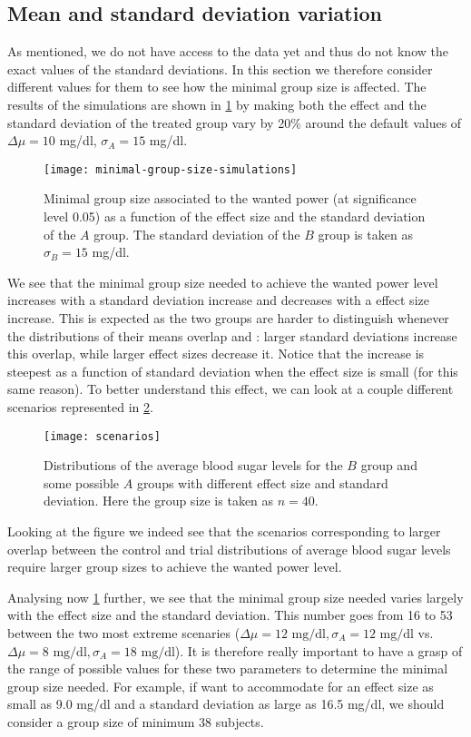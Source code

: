 \documentclass[a4paper, 12pt,oneside]{article}
\begin{document}
	\subsection{Mean and standard deviation variation}
	As mentioned, we do not have access to the data yet and thus do not know the exact values of the standard deviations. In this section we therefore consider different values for them to see how the minimal group size is affected. The results of the simulations are shown in \ref{fig:minimal-group-size-simulations} by making both the effect and the standard deviation of the treated group vary by 20\% around the default values of $\Delta\mu = 10$ mg/dl, $\sigma_A=15$ mg/dl. 
	\begin{figure}[h!]
		\centering
		\vspace{0em}
		\texttt{[image: minimal-group-size-simulations]}
		\caption{Minimal group size associated to the wanted power (at significance level 0.05) as a function of the effect size and the standard deviation of the $A$ group. The standard deviation of the 
		$B$ group is taken as $\sigma_B=15$ mg/dl.}
		\label{fig:minimal-group-size-simulations}
	\end{figure}
	We see that the minimal group size needed to achieve the wanted power level increases with a standard deviation increase and decreases with a effect size increase. This is expected as the two groups are harder to distinguish whenever the distributions of their means overlap and : larger standard deviations increase this overlap, while larger effect sizes decrease it.
	Notice that the increase is steepest as a function of standard deviation when the effect size is small (for this same reason).
	To better understand this effect, we can look at a couple different scenarios represented in \ref{fig:scenarios}.
	\begin{figure}[h!]
		\centering
		\vspace{0em}
		\texttt{[image: scenarios]}
		\caption{Distributions of the average blood sugar levels for the $B$ group and some possible $A$ groups with different effect size and standard deviation. Here the group size is taken as $n=40$.}
		\label{fig:scenarios}
	\end{figure}
	Looking at the figure we indeed see that the scenarios corresponding to larger overlap between the control and trial distributions of average blood sugar levels require larger group sizes to achieve the wanted power level. 

	Analysing now \ref{fig:minimal-group-size-simulations} further, we see that the minimal group size needed varies largely with the effect size and the standard deviation. This number goes from 16 to 53 between the two most extreme scenaries ($\Delta\mu=12\text{ mg/dl},\sigma_A=12\text{ mg/dl}$ vs. $\Delta\mu=8\text{ mg/dl},\sigma_A=18\text{ mg/dl}$). It is therefore really important to have a grasp of the range of possible values for these two parameters to determine the minimal group size needed. For example, if want to accommodate for an effect size as small as 9.0 mg/dl and a standard deviation as large as 16.5 mg/dl, we should consider a group size of minimum 38 subjects. 
\end{document}

